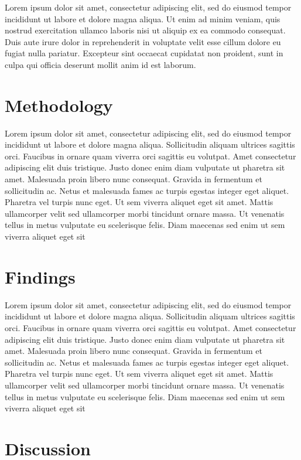 \documentclass[12pt,
 reprint,
nofootinbib,
 amsmath,amssymb,
 aps,
floatfix,
]{revtex4-2}
\begin{document}
Lorem ipsum dolor sit amet, consectetur adipiscing elit, sed do eiusmod tempor incididunt ut labore et dolore magna aliqua. Ut enim ad minim veniam, quis nostrud exercitation ullamco laboris nisi ut aliquip ex ea commodo consequat. Duis aute irure dolor in reprehenderit in voluptate velit esse cillum dolore eu fugiat nulla pariatur. Excepteur sint occaecat cupidatat non proident, sunt in culpa qui officia deserunt mollit anim id est laborum.

\section{Methodology}

Lorem ipsum dolor sit amet, consectetur adipiscing elit, sed do eiusmod tempor incididunt ut labore et dolore magna aliqua. Sollicitudin aliquam ultrices sagittis orci. Faucibus in ornare quam viverra orci sagittis eu volutpat. Amet consectetur adipiscing elit duis tristique. Justo donec enim diam vulputate ut pharetra sit amet. Malesuada proin libero nunc consequat. Gravida in fermentum et sollicitudin ac. Netus et malesuada fames ac turpis egestas integer eget aliquet. Pharetra vel turpis nunc eget. Ut sem viverra aliquet eget sit amet. Mattis ullamcorper velit sed ullamcorper morbi tincidunt ornare massa. Ut venenatis tellus in metus vulputate eu scelerisque felis. Diam maecenas sed enim ut sem viverra aliquet eget sit

\section{Findings}

Lorem ipsum dolor sit amet, consectetur adipiscing elit, sed do eiusmod tempor incididunt ut labore et dolore magna aliqua. Sollicitudin aliquam ultrices sagittis orci. Faucibus in ornare quam viverra orci sagittis eu volutpat. Amet consectetur adipiscing elit duis tristique. Justo donec enim diam vulputate ut pharetra sit amet. Malesuada proin libero nunc consequat. Gravida in fermentum et sollicitudin ac. Netus et malesuada fames ac turpis egestas integer eget aliquet. Pharetra vel turpis nunc eget. Ut sem viverra aliquet eget sit amet. Mattis ullamcorper velit sed ullamcorper morbi tincidunt ornare massa. Ut venenatis tellus in metus vulputate eu scelerisque felis. Diam maecenas sed enim ut sem viverra aliquet eget sit

\section{Discussion}
\end{document}
